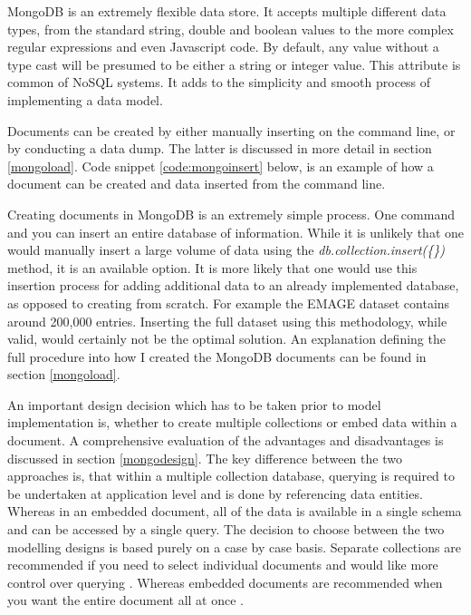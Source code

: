 MongoDB is an extremely flexible data store. It accepts multiple different data types, from the standard string, double and boolean values to the more complex regular expressions and even Javascript code. By default, any value without a type cast will be presumed to be either a string or integer value. This attribute is common of NoSQL systems. It adds to the simplicity and smooth process of implementing a data model.

Documents can be created by either manually inserting on the command line, or by conducting a data dump. The latter is discussed in more detail in section \ref{mongoload}. Code snippet \ref{code:mongoinsert} below, is an example of how a document can be created and data inserted from the command line.

Creating documents in MongoDB is an extremely simple process. One command and you can insert an entire database of information. While it is unlikely that one would manually insert a large volume of data using the \textit{db.collection.insert(\{\})} method, it is an available option. It is more likely that one would use this insertion process for adding additional data to an already implemented database, as opposed to creating from scratch. For example the EMAGE dataset contains around 200,000 entries. Inserting the full dataset using this methodology, while valid, would certainly not be the optimal solution. An explanation defining the full procedure into how I created the MongoDB documents can be found in section \ref{mongoload}.

An important design decision which has to be taken prior to model implementation is, whether to create multiple collections or embed data within a document. A comprehensive evaluation of the advantages and disadvantages is discussed in section \ref{mongodesign}. The key difference between the two approaches is, that within a multiple collection database, querying is required to be undertaken at application level and is done by referencing data entities. Whereas in an embedded document, all of the data is available in a single schema and can be accessed by a single query. The decision to choose between the two modelling designs is based purely on a case by case basis. Separate collections are recommended if you need to select individual documents and would like more control over querying \cite{mongo}. Whereas embedded documents are recommended when you want the entire document all at once \cite{mongo}.

